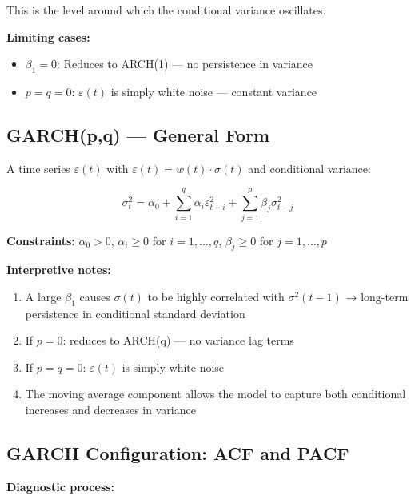 \documentclass[12pt,openany]{book}
\theoremstyle{definition}
\theoremstyle{remark}
\begin{document}
This is the level around which the conditional variance oscillates.

\textbf{Limiting cases:}

\begin{itemize}
\item $\beta_1 = 0$: Reduces to ARCH(1) --- no persistence in variance


\item $p = q = 0$: $\varepsilon(t)$ is simply white noise --- constant variance


\end{itemize}
\medskip
\subsection{GARCH(p,q) --- General Form}
A time series ${\varepsilon(t)}$ with $\varepsilon(t) = w(t) \cdot \sigma(t)$ and conditional variance:

\[
\boxed{\sigma^2_t = \alpha_0 + \sum_{i=1}^{q} \alpha_i \varepsilon^2_{t-i} + \sum_{j=1}^{p} \beta_j \sigma^2_{t-j}}
\]

\textbf{Constraints:} $\alpha_0 > 0$, $\alpha_i \geq 0$ for $i=1,\ldots,q$, $\beta_j \geq 0$ for $j=1,\ldots,p$

\textbf{Interpretive notes:}

\begin{enumerate}
\item A large $\beta_1$ causes $\sigma(t)$ to be highly correlated with $\sigma^2(t-1)$ → long-term persistence in conditional standard deviation


\item If $p = 0$: reduces to ARCH(q) --- no variance lag terms


\item If $p = q = 0$: $\varepsilon(t)$ is simply white noise


\item The moving average component allows the model to capture both conditional increases and decreases in variance


\end{enumerate}
\medskip
\subsection{GARCH Configuration: ACF and PACF}
\textbf{Diagnostic process:}
\end{document}
